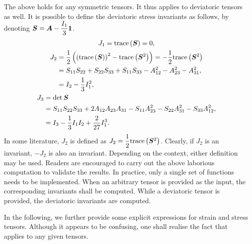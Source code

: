 The above holds for any symmetric tensors.
It thus applies to deviatoric tensors as well.
It is possible to define the deviatoric stress invariants as follows, by denoting $\bm{S}=\bm{A}-\dfrac{I_1}{3}\bm{1}$.
\begin{gather}
J_1=\text{trace}\left(\bm{S}\right)=0,\\
\begin{split}
J_2&=\dfrac{1}{2}\left(\left(\text{trace}\left(\bm{S}\right)\right)^2-\text{trace}\left(\bm{S}^2\right)\right)=-\dfrac{1}{2}\text{trace}\left(\bm{S}^2\right)\\
&=S_{11}S_{22}+S_{22}S_{33}+S_{11}S_{33}-A_{12}^2-A_{23}^2-A_{31}^2,\\
&=I_2-\dfrac{1}{3}I_1^2,
\end{split}\\
\begin{split}
J_3&=\det{\bm{S}}\\
&=S_{11}S_{22}S_{33}+2A_{12}A_{23}A_{31}-S_{11}A_{23}^2-S_{22}A_{31}^2-S_{33}A_{12}^2,\\
&=I_3-\dfrac{1}{3}I_1I_2+\dfrac{2}{27}I_1^3.
\end{split}
\end{gather}
In some literature, $J_2$ is defined as $J_2=\dfrac{1}{2}\text{trace}\left(\bm{S}^2\right)$.
Clearly, if $J_2$ is an invariant, $-J_2$ is also an invariant.
Depending on the context, either definition may be used.
Readers are encouraged to carry out the above laborious computation to validate the results.
In practice, only a single set of functions needs to be implemented.
When an arbitrary tensor is provided as the input, the corresponding invariants shall be computed.
While a deviatoric tensor is provided, the deviatoric invariants are computed.

In the following, we further provide some explicit expressions for strain and stress tensors.
Although it appears to be confusing, one shall realise the fact that  applies to any given tensors.
